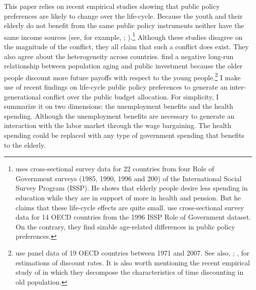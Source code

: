 This paper relies on recent empirical studies showing that public policy preferences are likely to change over the life-cycle. Because the youth and their elderly do not benefit from the same public policy instruments neither have the same income sources (see, for example, \citealt{Busemeyer2009}; \citealt{Sorensen2013}).\footnote{\cite{Sorensen2013} uses cross-sectional survey data for 22 countries from four Role of Government surveys (1985, 1990, 1996 and 200) of the International Social Survey Program (ISSP). He shows that elderly people desire less spending in education while they are in support of more in health and pension. But he claims that these life-cycle effects are quite small. \cite{Busemeyer2009} use cross-sectional survey data for 14 OECD countries from the 1996 ISSP Role of Government dataset. On the contrary, they find sizable age-related differences in public policy preferences.} Although these studies disagree on the magnitude of the conflict, they all claim that such a conflict does exist. They also agree about the heterogeneity across countries. \cite{Jager2016} find a negative long-run relationship between population aging and public investment because the older people discount more future payoffs with respect to the young people.\footnote{\cite{Jager2016} use panel data of 19 OECD countries between 1971 and 2007. See also, \cite{Harrison2002}; \cite{Read2004}, for estimations of discount rates. It is also worth mentioning the recent empirical study of \cite{Huffman2017} in which they decompose the characteristics of time discounting in old population.} 
I make use of recent findings on life-cycle public policy preferences to generate an inter-generational conflict over the public budget allocation. For simplicity, I summarize it on two dimensions: the unemployment benefits and the health spending. Although the unemployment benefits are necessary to generate an interaction with the labor market through the wage bargaining. The health spending could be replaced with any type of government spending that benefits to the elderly.

